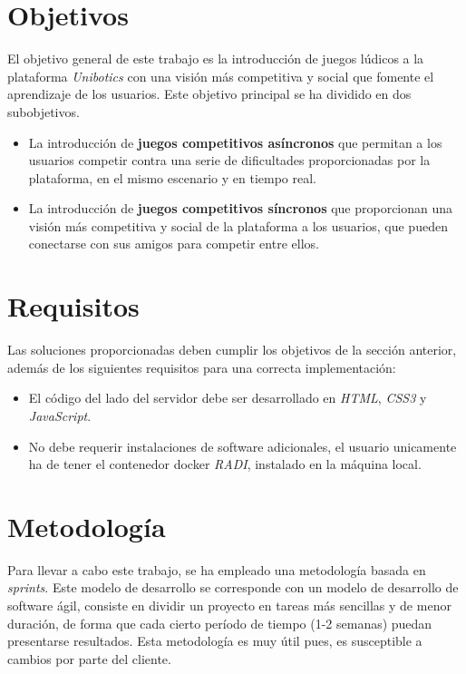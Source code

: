 \documentclass[a4paper, 12pt]{book}
\begin{document}
\section{Objetivos} %
\label{sec:objetivo-general} %

El objetivo general de este trabajo es la introducción de juegos lúdicos a la plataforma \emph{Unibotics} con una visión más competitiva y social que fomente el aprendizaje de los usuarios. Este objetivo principal se ha dividido en dos subobjetivos.

\begin{itemize}
\item La introducción de \textbf{juegos competitivos asíncronos} que permitan a los usuarios competir contra una serie de dificultades proporcionadas por la plataforma, en el mismo escenario y en tiempo real.
\item La introducción de \textbf{juegos competitivos síncronos} que proporcionan una visión más competitiva y social de la plataforma a los usuarios, que pueden conectarse con sus amigos para competir entre ellos.
\end{itemize}

\section{Requisitos}
\label{sec:requisitos}

Las soluciones proporcionadas deben cumplir los objetivos de la sección anterior, además de los siguientes requisitos para una correcta implementación:

\begin{itemize}
\item El código del lado del servidor debe ser desarrollado en \emph{HTML}, \emph{CSS3} y \emph{JavaScript}.
\item No debe requerir instalaciones de software adicionales, el usuario unicamente ha de tener el contenedor docker \emph{RADI}, instalado en la máquina local.
\end{itemize}

\section{Metodología}
\label{sec:metodologia}

Para llevar a cabo este trabajo, se ha empleado una metodología basada en \emph{sprints}. Este modelo de desarrollo se corresponde con un modelo de desarrollo de software ágil, consiste en dividir un proyecto en tareas más sencillas y de menor duración, de forma que cada cierto período de tiempo (1-2 semanas) puedan presentarse resultados. Esta metodología es muy útil pues, es susceptible a cambios por parte del cliente.
\end{document}
